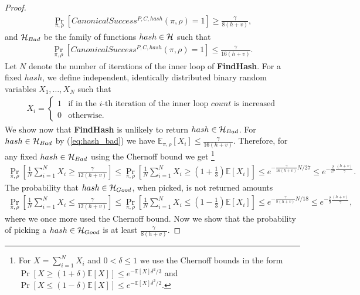 \begin{proof}
\begin{align}
  \label{eq:hash_good}
\underset{\pi, \rho}{\Pr}\left[CanonicalSuccess^{P, C, hash}(\pi, \rho) = 1\right] \geq \frac{\gamma}{8(h+v)},
\end{align}
and $\mathcal{H}_{Bad}$ be the family of functions $hash \in \mathcal{H}$ such that
\begin{align}
  \label{eq:hash_bad}
\underset{\pi, \rho}{\Pr}\left[CanonicalSuccess^{P, C, hash}(\pi, \rho) = 1\right] \leq \frac{\gamma}{16(h+v)}.
\end{align}
%
Let $N$ denote the number of iterations of the inner loop of \textbf{FindHash}.
For a fixed $hash$, we define independent, identically distributed binary random variables $X_1, \dots, X_{N}$ such that
\begin{align*}
  X_i =
  \begin{cases}
    1 & \text{if in the $i$-th iteration of the inner loop $count$ is increased}\\
    0 & \text{otherwise.}
  \end{cases}
\end{align*}
We show now that \textbf{FindHash} is unlikely to return $hash \in \mathcal{H}_{Bad}$.
For $hash \in \mathcal{H}_{Bad}$ by (\ref{eq:hash_bad}) we have $\mathbb{E}_{{\pi}, \rho}[X_i] \leq \frac{\gamma}{16(h+v)}$.
Therefore, for any fixed $hash \in \mathcal{H}_{Bad}$ using the Chernoff bound we get
\footnote{For $X = \sum_{i=1}^N X_i$ and $0 < \delta \leq 1$ we use the Chernoff bounds in the form
$\Pr[X \geq (1+\delta) \mathbb{E}[X]] \leq e^{- \mathbb{E}[X] \delta^2/3}$ and
$\Pr[X \leq (1-\delta) \mathbb{E}[X]] \leq e^{- \mathbb{E}[X] \delta^2/2}$.}
\begin{align*}
  \underset{\pi,\rho}{\Pr} \left[\frac{1}{N} \sum_{i=1}^{N} X_i \geq \frac{\gamma}{12(h+v)} \right] \leq
  \underset{\pi, \rho}{\Pr}\left[\frac{1}{N} \sum_{i=1}^{N} X_i \geq (1 + \frac{1}{3}) \mathbb{E}[X_i]\right] \leq
  e^{-{\frac{\gamma}{16(h+v)}} N / 27} \leq e^{-\frac{2}{27}\frac{(h+v)}{\gamma}}.
\end{align*}
%
The probability that $hash \in \mathcal{H}_{Good}$, when picked, is not returned amounts
\begin{align*}
  \underset{\pi, \rho}{\Pr}\left[\frac{1}{N} \sum_{i=1}^{N} X_i \leq \frac{\gamma}{12(h+v)}\right] \leq
  \underset{\pi, \rho}{\Pr}\left[\frac{1}{N} \sum_{i=1}^{N} X_i \leq (1 - \frac{1}{3})\mathbb{E}[X_i]\right]
  \leq e^{-{\frac{\gamma}{8(h+v)}} N / 18} \leq e^{-\frac{2}{9} \frac{(h+v)}{\gamma}},
\end{align*}
where we once more used the Chernoff bound.
Now we show that the probability of picking a $hash \in \mathcal{H}_{Good}$ is at least $\frac{\gamma}{8(h+v)}$.

\end{proof}
